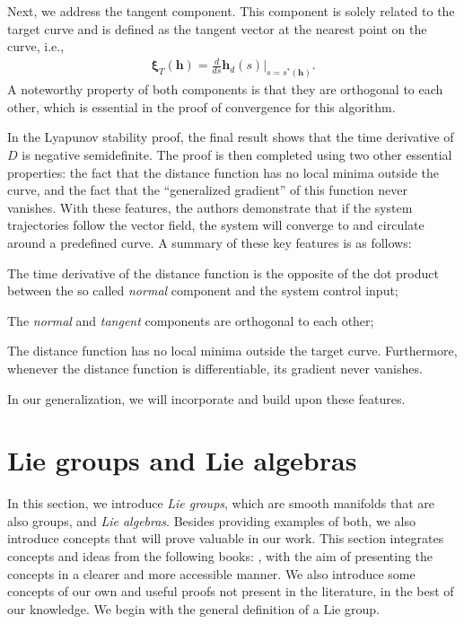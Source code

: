 Next, we address the tangent component. This component is solely related to the target curve and is defined as the tangent vector at the nearest point on the curve, i.e.,
\begin{align}
    \boldsymbol{\xi}_{T}(\mathbf{h}) = \frac{d}{ds}\mathbf{h}_d(s)|_{s=s^*(\mathbf{h})}.
\end{align}
A noteworthy property of both components is that they are orthogonal to each other, which is essential in the proof of convergence for this algorithm.

In the Lyapunov stability proof, the final result shows that the time derivative of $D$ is negative semidefinite. The proof is then completed using two other essential properties: the fact that the distance function has no local minima outside the curve, and the fact that the ``generalized gradient'' of this function never vanishes. With these features, the authors demonstrate that if the system trajectories follow the vector field, the system will converge to and circulate around a predefined curve. A summary of these key features is as follows:
\begin{feature}
    \item The time derivative of the distance function is the opposite of the dot product between the so called \emph{normal} component and the system control input; \label{feat:adriano-time-derivative-lyapunov-normal-comp}
    \item The \emph{normal} and \emph{tangent} components are orthogonal to each other; \label{feat:adriano-orthogonality}
    \item The distance function has no local minima outside the target curve. Furthermore, whenever the distance function is differentiable, its gradient never vanishes. \label{feat:adriano-no-local-minima}
\end{feature}
In our generalization, we will incorporate and build upon these features.

\section{Lie groups and Lie algebras}\label{sec:background-lie-theory}
In this section, we introduce \emph{Lie groups}, which are smooth manifolds that are also groups, and \emph{Lie algebras}. Besides providing examples of both, we also introduce concepts that will prove valuable in our work. This section integrates concepts and ideas from the following books: \citet{Lee2012,Gallier2020,Hall2015,Duistermaat2012}, with the aim of presenting the concepts in a clearer and more accessible manner. We also introduce some concepts of our own and useful proofs not present in the literature, in the best of our knowledge. We begin with the general definition of a Lie group.

